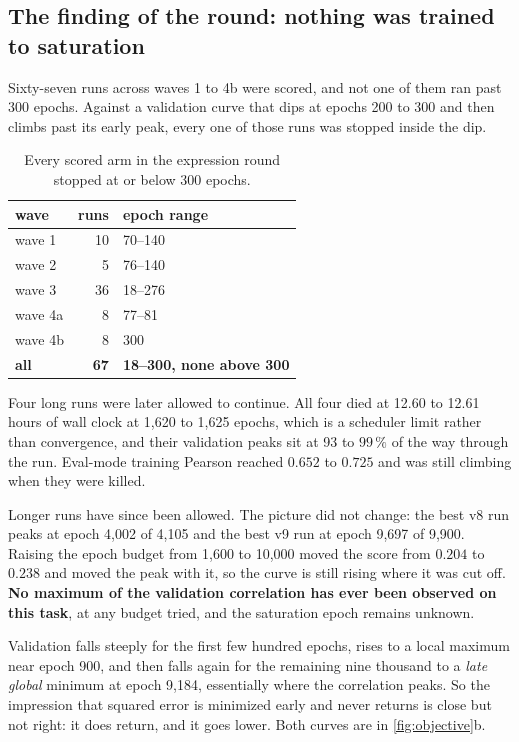 \subsection{The finding of the round: nothing was trained to saturation}

Sixty-seven runs across waves 1 to 4b were scored, and not one of them ran past 300 epochs.
Against a validation curve that dips at epochs 200 to 300 and then climbs past its early
peak, every one of those runs was stopped inside the dip.

\begin{table}[htbp]
\centering\small
\begin{tabular}{lrl}
\toprule
wave & runs & epoch range \\
\midrule
wave 1  & 10 & 70--140 \\
wave 2  &  5 & 76--140 \\
wave 3  & 36 & 18--276 \\
wave 4a &  8 & 77--81 \\
wave 4b &  8 & 300 \\
\midrule
\textbf{all} & \textbf{67} & \textbf{18--300, none above 300} \\
\bottomrule
\end{tabular}
\caption[]{Every scored arm in the expression round stopped at or below 300 epochs.}
\label{tab:expr-truncation}
\end{table}

Four long runs were later allowed to continue. All four died at 12.60 to 12.61 hours of
wall clock at 1,620 to 1,625 epochs, which is a scheduler limit rather than convergence,
and their validation peaks sit at 93 to $99\,\%$ of the way through the run. Eval-mode
training Pearson reached $0.652$ to $0.725$ and was still climbing when they were killed.

Longer runs have since been allowed. The picture did not change: the best v8 run peaks at
epoch 4,002 of 4,105 and the best v9 run at epoch 9,697 of 9,900. Raising the epoch budget
from 1,600 to 10,000 moved the score from $0.204$ to $0.238$ and moved the peak with it, so
the curve is still rising where it was cut off. \textbf{No maximum of the validation
correlation has ever been observed on this task}, at any budget tried, and the saturation
epoch remains unknown.

 Validation  falls steeply for the first
few hundred epochs, rises to a local maximum near epoch 900, and then falls again for the
remaining nine thousand to a \emph{late global} minimum at epoch 9,184, essentially where
the correlation peaks. So the impression that squared error is minimized early and never
returns is close but not right: it does return, and it goes lower. Both curves are in
\cref{fig:objective}b.

